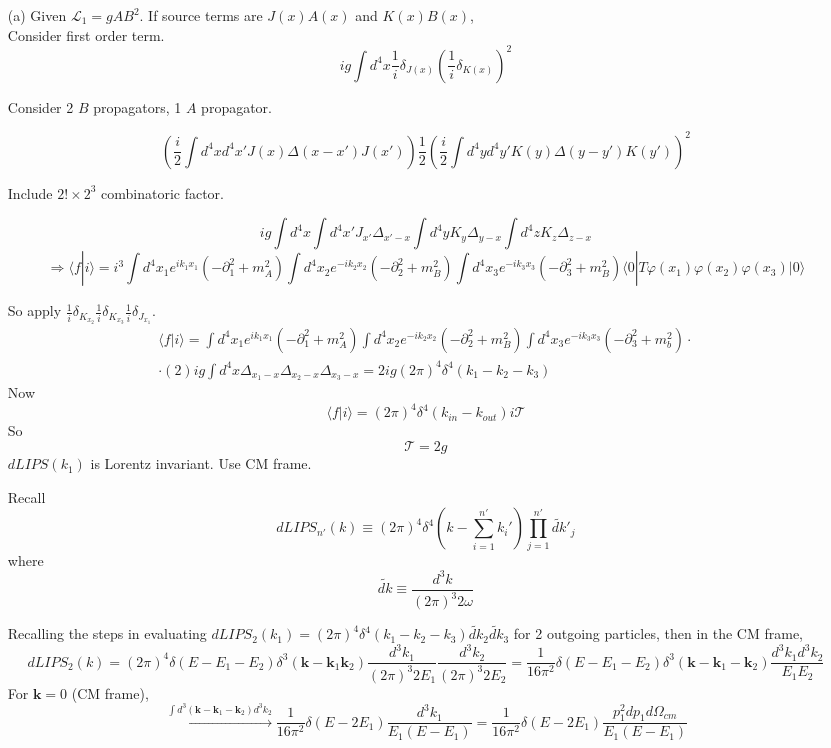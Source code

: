 \documentclass[twoside]{amsart}
\newcommand{\solutionhead}[1]
  {\smallskip
   \noindent{\large\bf Solution #1.}
   }
\begin{document}
\solutionhead{11.1} \begin{itemize}
\item[(a)] Given $\mathcal{L}_1 = g AB^2$.  If source terms are $J(x) A(x)$ and $K(x) B(x)$, \\

Consider first order term.  
\[
ig \int d^4x \frac{1}{i} \delta_{J(x)} \left( \frac{1}{i} \delta_{K(x)} \right)^2 
\]

Consider 2 $B$ propagators, 1 $A$ propagator.  

\[
\left( \frac{i}{2} \int d^4x d^4x' J(x) \Delta(x-x') J(x') \right) \frac{1}{2} \left( \frac{i}{2} \int d^4y d^4y' K(y) \Delta(y-y') K(y') \right)^2 
\]

Include $2! \times 2^3$ combinatoric factor.  

\[
ig \int d^4x \int d^4x' J_{x'} \Delta_{x'-x} \int d^4y K_y \Delta_{y-x} \int d^4z K_z \Delta_{z-x}
\]
\[
\Longrightarrow \langle f|i \rangle = i^3 \int d^4x_1 e^{ik_1 x_1} ( - \partial_1^2 + m_A^2 ) \int d^4x_2 e^{-ik_2 x_2} ( - \partial_2^2 + m_B^2 ) \int d^4x_3 e^{-ik_3 x_3} (- \partial_3^2 + m_B^2 ) \langle 0 | T \varphi(x_1) \varphi(x_2) \varphi(x_3) | 0 \rangle
\]

So apply $\frac{1}{i} \delta_{K_{x_2}} \frac{1}{i} \delta_{K_{x_3} } \frac{1}{i} \delta_{J_{x_1}}$.  
\[
\begin{gathered}
  \langle f | i \rangle = \int d^4x_1 e^{ik_1 x_1} (-\partial_1^2 + m_A^2) \int d^4x_2 e^{-ik_2x_2} (- \partial_2^2 +m_B^2 ) \int d^4x_3 e^{-ik_3 x_3} ( - \partial_3^2 + m_b^2 )   \cdot \\ 
  \cdot (2) ig \int d^4x \Delta_{x_1-x} \Delta_{x_2 -x} \Delta_{x_3 - x} = 2 ig (2\pi)^4 \delta^4(k_1 -k_2 -k_3)
\end{gathered}
\]
Now
\[
\langle f | i \rangle = (2\pi)^4 \delta^4(k_{in} - k_{out} ) i \mathcal{T}
\]
So 
\[
\mathcal{T} = 2g
\]
$dLIPS(k_1)$ is Lorentz invariant.  Use CM frame.  

Recall 
\[
dLIPS_{n'}(k) \equiv (2\pi)^4 \delta^4(k- \sum_{i=1}^{n'} k_i') \prod_{j=1}^{n'} \widetilde{dk}'_j
\]
where 
\[
\widetilde{dk} \equiv \frac{d^3k}{ (2\pi)^3 2 \omega }
\]

Recalling the steps in evaluating $dLIPS_2(k_1) = (2\pi)^4 \delta^4(k_1 - k_2 - k_3 ) \widetilde{dk}_2 \widetilde{dk}_3$ for 2 outgoing particles, then in the CM frame,
\[
dLIPS_2(k) = (2\pi)^4 \delta(E-E_1-E_2) \delta^3(\mathbf{k} - \mathbf{k}_1 \mathbf{k}_2 ) \frac{ d^3k_1}{ (2\pi)^3 2 E_1 } \frac{ d^3k_2 }{ (2\pi)^3 2E_2 } = \frac{1}{16 \pi^2 } \delta(E-E_1 - E_2) \delta^3(\mathbf{k} - \mathbf{k}_1  - \mathbf{k}_2 ) \frac{ d^3k_1 d^3k_2 }{ E_1 E_2} 
\]
For $\mathbf{k} = 0$ (CM frame),
\[
\xrightarrow{ \int d^3(\mathbf{k} - \mathbf{k}_1 - \mathbf{k}_2 ) d^3k_2} \frac{1}{16\pi^2} \delta(E- 2E_1) \frac{ d^3k_1}{ E_1 ( E-E_1) } = \frac{1}{16 \pi^2 } \delta(E-2E_1) \frac{ p_1^2 dp_1 d\Omega_{cm} }{ E_1 ( E-E_1) }
\]


\end{itemize}
\end{document}
